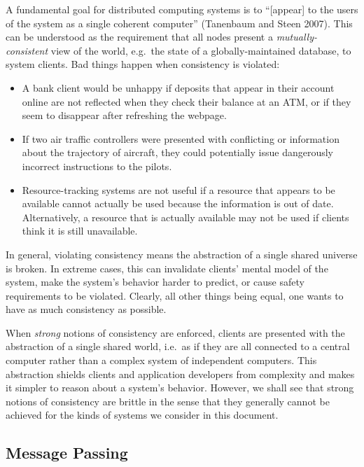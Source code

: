 \documentclass[]             %
{NASA}                       %
\theoremstyle{definition}
\begin{document}
A fundamental goal for distributed computing systems is to
``{[}appear{]} to the users of the system as a single coherent
computer'' (Tanenbaum and Steen 2007). This can be understood as the
requirement that all nodes present a \emph{mutually-consistent} view of
the world, e.g.~the state of a globally-maintained database, to system
clients. Bad things happen when consistency is violated:

\begin{itemize}
\item
  A bank client would be unhappy if deposits that appear in their
  account online are not reflected when they check their balance at an
  ATM, or if they seem to disappear after refreshing the webpage.
\item
  If two air traffic controllers were presented with conflicting or
  information about the trajectory of aircraft, they could potentially
  issue dangerously incorrect instructions to the pilots.
\item
  Resource-tracking systems are not useful if a resource that appears to
  be available cannot actually be used because the information is out of
  date. Alternatively, a resource that is actually available may not be
  used if clients think it is still unavailable.
\end{itemize}

In general, violating consistency means the abstraction of a single
shared universe is broken. In extreme cases, this can invalidate
clients' mental model of the system, make the system's behavior harder
to predict, or cause safety requirements to be violated. Clearly, all
other things being equal, one wants to have as much consistency as
possible.

When \emph{strong} notions of consistency are enforced, clients are
presented with the abstraction of a single shared world, i.e.~as if they
are all connected to a central computer rather than a complex system of
independent computers. This abstraction shields clients and application
developers from complexity and makes it simpler to reason about a
system's behavior. However, we shall see that strong notions of
consistency are brittle in the sense that they generally cannot be
achieved for the kinds of systems we consider in this document.

\hypertarget{message-passing}{%
\subsection{Message Passing}\label{message-passing}}
\end{document}
